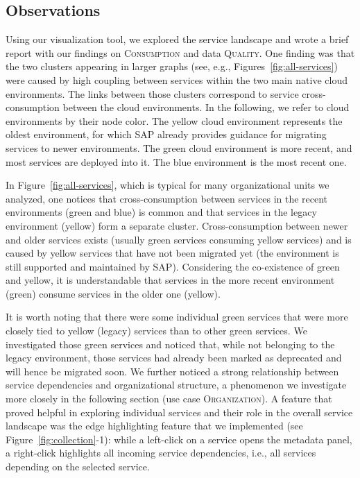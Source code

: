 \documentclass[conference]{IEEEtran}
\begin{document}
\subsection{Observations}
\label{sec:initial-observations}

Using our visualization tool, we explored the service landscape and wrote a brief report with our findings on \textsc{Consumption} and data \textsc{Quality}.
One finding was that the two clusters appearing in larger graphs (see, e.g., Figures~\ref{fig:all-services}) were caused by high coupling between services within the two main native cloud environments.
The links between those clusters correspond to service cross-consumption between the cloud environments.
In the following, we refer to cloud environments by their node color.
The yellow cloud environment represents the oldest environment, for which SAP already provides guidance for migrating services to newer environments.
The green cloud environment is more recent, and most services are deployed into it.
The blue environment is the most recent one.

In Figure~\ref{fig:all-services}, which is typical for many organizational units we analyzed, one notices that cross-consumption between services in the recent environments (green and blue) is common and that services in the legacy environment (yellow) form a separate cluster.
Cross-consumption between newer and older services exists (usually green services consuming yellow services) and is caused by yellow services that have not been migrated yet (the environment is still supported and maintained by SAP).
Considering the co-existence of green and yellow, it is understandable that services in the more recent environment (green) consume services in the older one (yellow). 

It is worth noting that there were some individual green services that were more closely tied to yellow (legacy) services than to other green services.
We investigated those green services and noticed that, while not belonging to the legacy environment, those services had already been marked as deprecated and will hence be migrated soon.
We further noticed a strong relationship between service dependencies and organizational structure, a phenomenon we investigate more closely in the following section (use case \textsc{Organization}).
A feature that proved helpful in exploring individual services and their role in the overall service landscape was the edge highlighting feature that we implemented (see Figure~\ref{fig:collection}-1): while a left-click on a service opens the metadata panel, a right-click highlights all incoming service dependencies, i.e., all services depending on the selected service.
\end{document}
